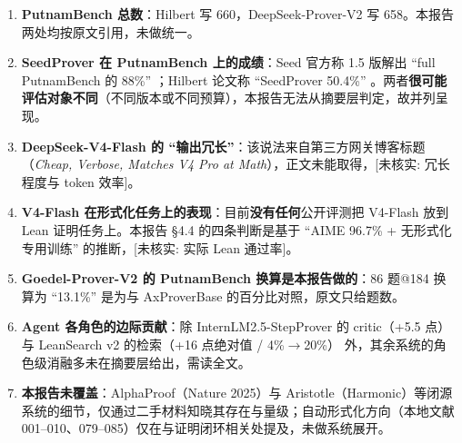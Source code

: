 \documentclass[UTF8,a4paper,11pt,fontset=windows]{ctexart}
\newcommand{\unverified}[1]{\textcolor{warnred}{[未核实: #1]}}
\begin{document}
\begin{enumerate}
  \item \textbf{PutnamBench 总数}：Hilbert 写 660，DeepSeek-Prover-V2 写 658。本报告两处均按原文引用，未做统一。
  \item \textbf{SeedProver 在 PutnamBench 上的成绩}：Seed 官方称 1.5 版解出 ``full PutnamBench 的 88\%'' \cite{seedprover}；Hilbert 论文称 ``SeedProver 50.4\%'' \cite{hilbert}。两者\textbf{很可能评估对象不同}（不同版本或不同预算），本报告无法从摘要层判定，故并列呈现。
  \item \textbf{DeepSeek-V4-Flash 的 ``输出冗长''}：该说法来自第三方网关博客标题（\emph{Cheap, Verbose, Matches V4 Pro at Math}），正文未能取得，\unverified{冗长程度与 token 效率}。
  \item \textbf{V4-Flash 在形式化任务上的表现}：目前\textbf{没有任何}公开评测把 V4-Flash 放到 Lean 证明任务上。本报告 \S4.4 的四条判断是基于 ``AIME 96.7\% + 无形式化专用训练'' 的推断，\unverified{实际 Lean 通过率}。
  \item \textbf{Goedel-Prover-V2 的 PutnamBench 换算是本报告做的}：86 题@184 换算为 ``13.1\%'' 是为与 AxProverBase 的百分比对照，原文只给题数。
  \item \textbf{Agent 各角色的边际贡献}：除 InternLM2.5-StepProver 的 critic（+5.5 点）\cite{internlm} 与 LeanSearch v2 的检索（+16 点绝对值 / 4\%$\rightarrow$20\%）\cite{leansearchv2} 外，其余系统的角色级消融多未在摘要层给出，需读全文。
  \item \textbf{本报告未覆盖}：AlphaProof（Nature 2025）与 Aristotle（Harmonic）等闭源系统的细节，仅通过二手材料知晓其存在与量级；自动形式化方向（本地文献 001--010、079--085）仅在与证明闭环相关处提及，未做系统展开。
\end{enumerate}
\end{document}
